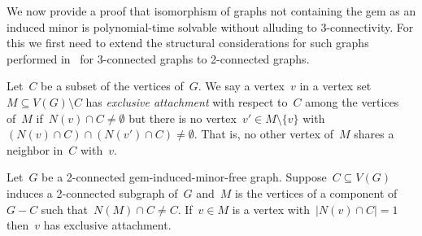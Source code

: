 \documentclass[envcountsame,envcountsect,11pt,a4paper]{llncs}
\begin{document}
We now provide a proof that isomorphism of graphs not containing the gem as an induced minor is polynomial-time solvable without alluding to 3-connectivity. For this we first need to extend the structural considerations for such graphs performed in~\cite{Ponomarenko88} for 3-connected graphs to 2-connected graphs.

Let~$C$ be a subset of the vertices of~$G$.
We say a vertex~$v$ in a vertex set~$M\subseteq V(G)\setminus C$ has \emph{exclusive attachment} with respect to~$C$ among the vertices of~$M$ if~$N(v)\cap C\neq \emptyset$ but there is no vertex~$v' \in M\setminus \{v\}$ with~$(N(v)\cap C) \cap (N(v')\cap C) \neq \emptyset$. That is, no other vertex of~$M$ shares a neighbor in~$C$ with~$v$.

\begin{lemma}
\label{only:one:neighbor:implies:exclusive:attachment}
Let~$G$ be a 2-connected gem-induced-minor-free graph.
Suppose~$C\subseteq V(G)$ induces a 2-connected subgraph of~$G$ and~$M$ is the vertices of a component
of~$G-C$ such that~$N(M) \cap C \neq C$.
If~$v\in M$ is a vertex with~$|N(v)\cap C| = 1$ then~$v$ has exclusive attachment.
\end{lemma}
\end{document}
